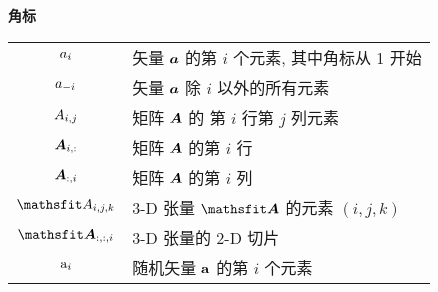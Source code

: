 \vspace{\notationgap}
\begin{minipage}{\textwidth}
\centerline{\bf 角标}
\bgroup
\def\arraystretch{1.5}
\begin{tabular}{cp{3.25in}}
$\displaystyle {a}_i$ & 矢量 ${\bm{a}}$ 的第 $i$ 个元素, 其中角标从 1 开始 \\
$\displaystyle {a}_{-i}$ & 矢量 ${\bm{a}}$ 除 $i$ 以外的所有元素 \\
$\displaystyle {A}_{i,j}$ & 矩阵 ${\bm{A}}$ 的 第 $i$ 行第 $j$ 列元素\\
$\displaystyle {\bm{A}}_{i, :}$ & 矩阵 ${\bm{A}}$ 的第 $i$ 行\\
$\displaystyle {\bm{A}}_{:, i}$ & 矩阵 ${\bm{A}}$ 的第 $i$ 列 \\
$\displaystyle \etA_{i, j, k}$ & 3-D 张量 $\tA$ 的元素 $(i, j, k)$\\
$\displaystyle \tA_{:, :, i}$ & 3-D 张量的 2-D 切片\\
$\displaystyle {\textnormal{a}}_i$ & 随机矢量 ${\mathbf{a}}$ 的第 $i$ 个元素\\
\end{tabular}
\egroup
\end{minipage}


